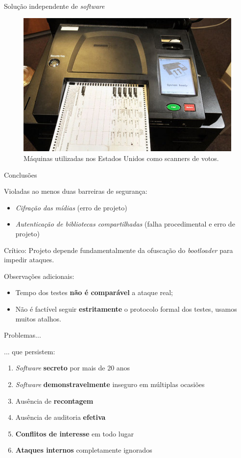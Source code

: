 \documentclass[10pt]{beamer}
\begin{document}
\begin{frame}{Solução independente de \emph{software}}
\begin{figure}
\caption{Máquinas utilizadas nos Estados Unidos como scanners de votos.}
\begin{center}
\includegraphics[scale=0.4]{scanner.jpg} 
\end{center}
\end{figure}
\end{frame}

\begin{frame}{Conclusões}

Violadas ao menos duas barreiras de segurança:
\begin{itemize}
 \item \emph{Cifração das mídias} (erro de projeto)
 \item \emph{Autenticação de bibliotecas compartilhadas} (falha procedimental e erro de projeto)
\end{itemize}

\alert{Crítico:} Projeto depende fundamentalmente da ofuscação do \emph{bootloader} para impedir ataques.

\medskip
Observações adicionais:
\begin{itemize}
 \item Tempo dos testes \textbf{não é comparável} a ataque real;
 \item Não é factível seguir \textbf{estritamente} o protocolo formal dos testes, usamos muitos atalhos.
\end{itemize}
\end{frame}

\begin{frame}{Problemas...}
\begin{block}{... que persistem:}
\begin{enumerate}
\item \emph{Software} {\bf secreto} por mais de 20 anos
\item \emph{Software} {\bf demonstravelmente} inseguro em múltiplas ocasiões
\item Ausência de {\bf recontagem}
\item Ausência de auditoria {\bf efetiva}
\item {\bf Conflitos de interesse} em todo lugar
\item {\bf Ataques internos} completamente ignorados
\end{enumerate}
\end{block}
\end{frame}
\end{document}
